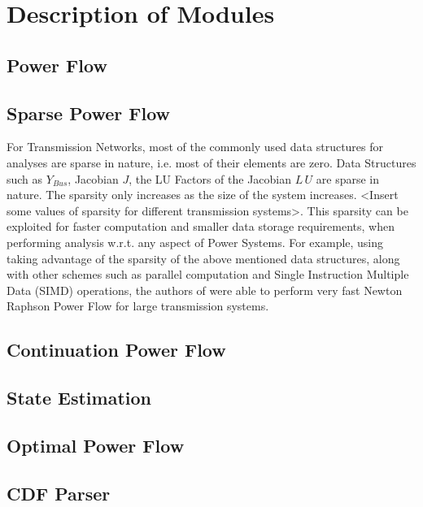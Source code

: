 \documentclass[varwidth]{standalone}
\providecommand{\powerflow}[1]{Power Flow}
\providecommand{\sparse}[1]{Sparse Power Flow}
\providecommand{\cpf}[1]{Continuation Power Flow}
\providecommand{\se}[1]{State Estimation}
\providecommand{\opf}[1]{Optimal Power Flow}
\begin{document}
\section{Description of Modules}

\subsection{\powerflow{}}

\subsection{\sparse{}}
    For Transmission Networks, most of the commonly used data structures for analyses are sparse in nature, i.e. most of their elements are zero. Data Structures such as $Y_{Bus}$, Jacobian $J$, the LU Factors of the Jacobian $L \, U$ are sparse in nature. The sparsity only increases as the size of the system increases. <Insert some values of sparsity for different transmission systems>. This sparsity can be exploited for faster computation and smaller data storage requirements, when performing analysis w.r.t. any aspect of Power Systems. For example, using taking advantage of the sparsity of the above mentioned data structures, along with other schemes such as parallel computation and Single Instruction Multiple Data (SIMD) operations, the authors of \cite{Ahmadi2021Sep} were able to perform very fast Newton Raphson Power Flow for large transmission systems.

\subsection{\cpf{}}

\subsection{\se{}}

\subsection{\opf{}}

\subsection{CDF Parser}

\ifstandalone


\fi
\end{document}
